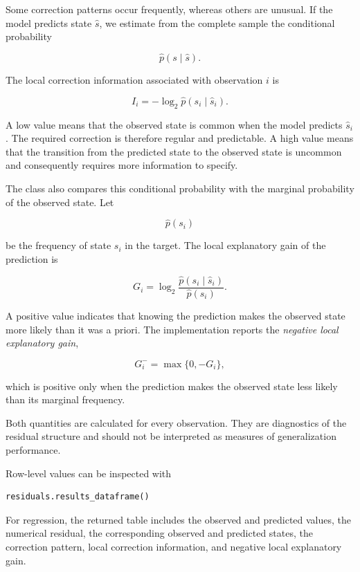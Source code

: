 Some correction patterns occur frequently, whereas others are unusual. If the
model predicts state \(\widehat s\), we estimate from the complete sample the
conditional probability

\[
\widehat p(s\mid\widehat s).
\]

The local correction information associated with observation \(i\) is

\[
I_i
=
-\log_2
\widehat p(s_i\mid\widehat s_i).
\]

A low value means that the observed state is common when the model predicts
\(\widehat s_i\). The required correction is therefore regular and predictable.
A high value means that the transition from the predicted state to the observed
state is uncommon and consequently requires more information to specify.

The class also compares this conditional probability with the marginal
probability of the observed state. Let

\[
\widehat p(s_i)
\]

be the frequency of state \(s_i\) in the target. The local explanatory gain of
the prediction is

\[
G_i
=
\log_2
\frac{
    \widehat p(s_i\mid\widehat s_i)
}{
    \widehat p(s_i)
}.
\]

A positive value indicates that knowing the prediction makes the observed state
more likely than it was a priori. The implementation reports the
\emph{negative local explanatory gain},

\[
G_i^{-}
=
\max\{0,-G_i\},
\]

which is positive only when the prediction makes the observed state less likely
than its marginal frequency.

Both quantities are calculated for every observation. They are diagnostics of
the residual structure and should not be interpreted as measures of
generalization performance.

Row-level values can be inspected with

\begin{sourcecode}
{\scriptsize
\begin{verbatim}
residuals.results_dataframe()
\end{verbatim}}
\end{sourcecode}

For regression, the returned table includes the observed and predicted values,
the numerical residual, the corresponding observed and predicted states, the
correction pattern, local correction information, and negative local
explanatory gain.

